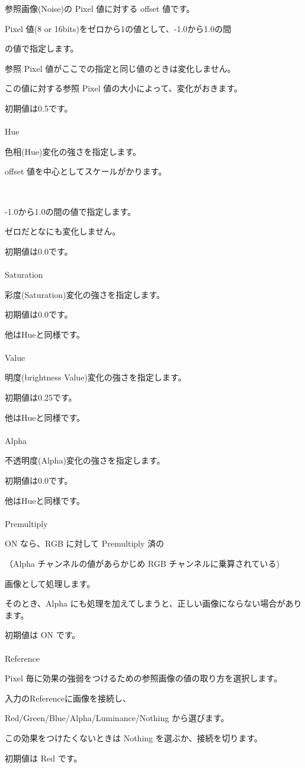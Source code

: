 \documentclass[a4paper,12pt]{article}
\begin{document}
参照画像(Noise)の Pixel 値に対する offset 値です。\par
Pixel 値(8 or 16bits)をゼロから1の値として、-1.0から1.0の間\par
の値で指定します。\par
参照 Pixel 値がここでの指定と同じ値のときは変化しません。\par
この値に対する参照 Pixel 値の大小によって、変化がおきます。\par
初期値は0.5です。\\
\\
Hue\par
色相(Hue)変化の強さを指定します。\par
offset 値を中心としてスケールがかります。

\newpage

\thispagestyle{empty}

\ \vspace{-0.2em}
\par
-1.0から1.0の間の値で指定します。\par
ゼロだとなにも変化しません。\par
初期値は0.0です。\\
\\
Saturation\par
彩度(Saturation)変化の強さを指定します。\par
初期値は0.0です。\par
他は\textquotedbl Hue\textquotedbl と同様です。\\
\\
Value\par
明度(brightness Value)変化の強さを指定します。\par
初期値は0.25です。\par
他は\textquotedbl Hue\textquotedbl と同様です。\\
\\
Alpha\par
不透明度(Alpha)変化の強さを指定します。\par
初期値は0.0です。\par
他は\textquotedbl Hue\textquotedbl と同様です。\\
\\
Premultiply\par
ON なら、RGB に対して Premultiply 済の\par
（Alpha チャンネルの値があらかじめ RGB チャンネルに乗算されている)\par
画像として処理します。\par
そのとき、Alpha にも処理を加えてしまうと、正しい画像にならない場合があります。\par
初期値は ON です。\\
\\
Reference\par
Pixel 毎に効果の強弱をつけるための参照画像の値の取り方を選択します。\par
入力の\textquotedbl Reference\textquotedbl に画像を接続し、\par
Red/Green/Blue/Alpha/Luminance/Nothing から選びます。\par
この効果をつけたくないときは Nothing を選ぶか、接続を切ります。\par
初期値は Red です。
\end{document}
